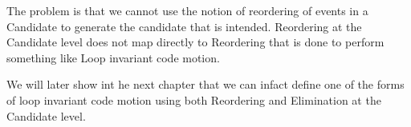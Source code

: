 

            The problem is that we cannot use the notion of reordering of events in a Candidate to generate the candidate that is intended. Reordering at the Candidate level does not map directly to Reordering that is done to perform something like Loop invariant code motion. 

            We will later show int he next chapter that we can infact define one of the forms of loop invariant code motion using both Reordering and Elimination at the Candidate level.
             
    